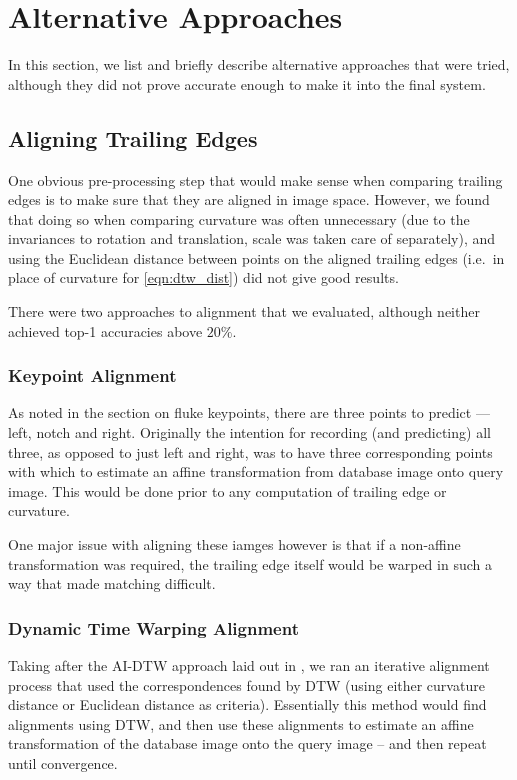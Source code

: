 \section{Alternative Approaches}

In this section, we list and briefly describe alternative approaches that were tried, although they did not prove accurate enough to make it into the final system.

\subsection{Aligning Trailing Edges}

One obvious pre-processing step that would make sense when comparing trailing edges is to make sure that they are aligned in image space.
However, we found that doing so when comparing curvature was often unnecessary (due to the invariances to rotation and translation, scale was taken care of separately), and using the Euclidean distance between points on the aligned trailing edges (i.e.\ in place of curvature for \eqref{eqn:dtw_dist}) did not give good results.

There were two approaches to alignment that we evaluated, although neither achieved top-1 accuracies above $20\%$.

\subsubsection{Keypoint Alignment}

As noted in the section on fluke keypoints, there are three points to predict --- left, notch and right.
Originally the intention for recording (and predicting) all three, as opposed to just left and right, was to have three corresponding points with which to estimate an affine transformation from database image onto query image.
This would be done prior to any computation of trailing edge or curvature.

One major issue with aligning these iamges however is that if a non-affine transformation was required, the trailing edge itself would be warped in such a way that made matching difficult.

\subsubsection{Dynamic Time Warping Alignment}

Taking after the AI-DTW approach laid out in \cite{qiao2006affine}, we ran an iterative alignment process that used the correspondences found by DTW (using either curvature distance or Euclidean distance as criteria).
Essentially this method would find alignments using DTW, and then use these alignments to estimate an affine transformation of the database image onto the query image -- and then repeat until convergence.

